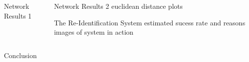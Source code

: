 \documentclass[final]{beamer}
\begin{document}
\begin{frame}{}
\begin{columns}[t]
\begin{column}{.49\linewidth}
\begin{block}{Network Results 1}
        \end{block}
	 \end{column}
	 \begin{column}{.49\linewidth}
 		\begin{block}{Network Results 2}
 		euclidean distance plots
 		
         
        \end{block}
        
        \begin{block}{The Re-Identification System}
        estimated sucess rate and reasons
        images of system in action
       
 		\hspace{.7cm}
        
        
        \hspace{.7cm}
        \end{block}
        
       
      \end{column}
    \end{columns}
     \begin{block}{Conclusion}

        
        \end{block}


  \end{frame}
\end{document}
